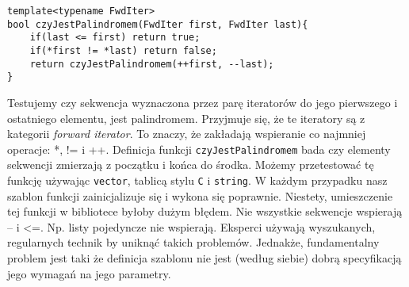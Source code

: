 \documentclass[11pt, a4paper]{article}
\begin{document}
\begin{lstlisting}[frame=single]
template<typename FwdIter>
bool czyJestPalindromem(FwdIter first, FwdIter last){
	if(last <= first) return true;
	if(*first != *last) return false;
	return czyJestPalindromem(++first, --last);
}

\end{lstlisting}

Testujemy czy sekwencja wyznaczona przez parę iteratorów do jego pierwszego i ostatniego elementu, jest palindromem. Przyjmuje się, że te iteratory są z kategorii \emph{forward iterator}. To znaczy, że zakładają wspieranie co najmniej operacje: *, != i ++. Definicja funkcji \verb#czyJestPalindromem# bada czy elementy sekwencji zmierzają z początku i końca do środka. Możemy przetestować tę funkcję używając \verb#vector#, tablicą stylu \verb#C# i \verb#string#. W każdym przypadku nasz szablon funkcji zainicjalizuje się i wykona się poprawnie. Niestety, umieszczenie tej funkcji w bibliotece byłoby dużym błędem. Nie wszystkie sekwencje wspierają -- i <=. Np. listy pojedyncze nie wspierają. Eksperci używają wyszukanych, regularnych technik by uniknąć takich problemów.  Jednakże, fundamentalny problem jest taki że definicja szablonu nie jest (według siebie) dobrą specyfikacją jego wymagań na jego parametry.
\end{document}
